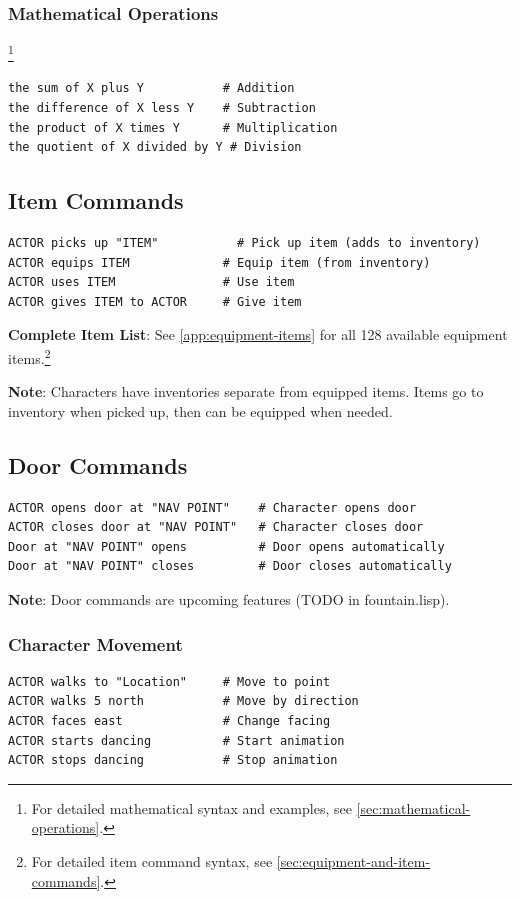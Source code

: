 \documentclass[11pt,letterpaper,oldstylefigures]{memoir}
\begin{document}
\subsubsection{Mathematical Operations}
\label{sec:mathematical-operations}
\footnote{For detailed mathematical syntax and examples, see \autoref{sec:mathematical-operations}.}
\begin{verbatim}
the sum of X plus Y           # Addition
the difference of X less Y    # Subtraction
the product of X times Y      # Multiplication
the quotient of X divided by Y # Division
\end{verbatim}

\subsection{Item Commands}
\begin{verbatim}
ACTOR picks up "ITEM"           # Pick up item (adds to inventory)
ACTOR equips ITEM             # Equip item (from inventory)
ACTOR uses ITEM               # Use item
ACTOR gives ITEM to ACTOR     # Give item
\end{verbatim}

\textbf{Complete Item List}: See \autoref{app:equipment-items} for all 128 available equipment items.\footnote{For detailed item command syntax, see \autoref{sec:equipment-and-item-commands}.}

\textbf{Note}: Characters have inventories separate from equipped items. Items go to inventory when picked up, then can be equipped when needed.

\subsection{Door Commands}
\begin{verbatim}
ACTOR opens door at "NAV POINT"    # Character opens door
ACTOR closes door at "NAV POINT"   # Character closes door
Door at "NAV POINT" opens          # Door opens automatically
Door at "NAV POINT" closes         # Door closes automatically
\end{verbatim}

\textbf{Note}: Door commands are upcoming features (TODO in fountain.lisp).

\subsubsection{Character Movement}
\begin{verbatim}
ACTOR walks to "Location"     # Move to point
ACTOR walks 5 north           # Move by direction
ACTOR faces east              # Change facing
ACTOR starts dancing          # Start animation
ACTOR stops dancing           # Stop animation
\end{verbatim}
\end{document}

